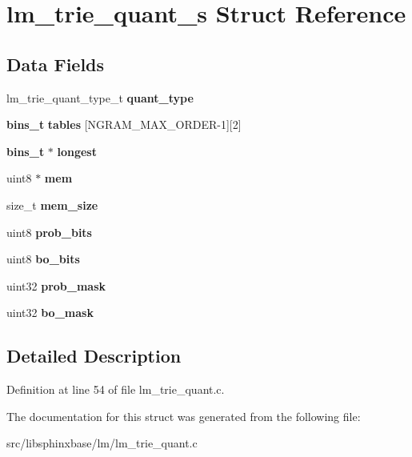\section{lm\+\_\+trie\+\_\+quant\+\_\+s Struct Reference}
\label{structlm__trie__quant__s}
\subsection*{Data Fields}
\begin{DoxyCompactItemize}
\item 
lm\+\_\+trie\+\_\+quant\+\_\+type\+\_\+t {\bfseries quant\+\_\+type}\label{structlm__trie__quant__s_a45b2e48c780354c98a7437c3d2eaf341}

\item 
{\bf bins\+\_\+t} {\bfseries tables} [N\+G\+R\+A\+M\+\_\+\+M\+A\+X\+\_\+\+O\+R\+D\+E\+R-\/1][2]\label{structlm__trie__quant__s_a73fa4af73d4a3767d221921f71a95940}

\item 
{\bf bins\+\_\+t} $\ast$ {\bfseries longest}\label{structlm__trie__quant__s_a218f78c52d512605133668b765e3260b}

\item 
uint8 $\ast$ {\bfseries mem}\label{structlm__trie__quant__s_add104d4880f471d73fd886b2eae7ca66}

\item 
size\+\_\+t {\bfseries mem\+\_\+size}\label{structlm__trie__quant__s_a348c9280b8fccbac99890a5bf3a69d94}

\item 
uint8 {\bfseries prob\+\_\+bits}\label{structlm__trie__quant__s_a3696f006dc23c7faddd81419aae4de64}

\item 
uint8 {\bfseries bo\+\_\+bits}\label{structlm__trie__quant__s_a7d8ec82f7dde68d7a7e4ea495972bddc}

\item 
uint32 {\bfseries prob\+\_\+mask}\label{structlm__trie__quant__s_ad70aed4374709125a85a915815538a61}

\item 
uint32 {\bfseries bo\+\_\+mask}\label{structlm__trie__quant__s_a2b8c82b5f452346651055c0cd7a3b3f2}

\end{DoxyCompactItemize}


\subsection{Detailed Description}


Definition at line 54 of file lm\+\_\+trie\+\_\+quant.\+c.



The documentation for this struct was generated from the following file\+:\begin{DoxyCompactItemize}
\item 
src/libsphinxbase/lm/lm\+\_\+trie\+\_\+quant.\+c\end{DoxyCompactItemize}
